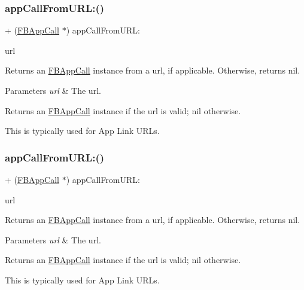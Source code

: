 \subsubsection{\texorpdfstring{app\+Call\+From\+U\+R\+L\+:()}{appCallFromURL:()}\hspace{0.1cm}{\footnotesize\ttfamily [3/5]}}
{\footnotesize\ttfamily + (\hyperlink{interfaceFBAppCall}{F\+B\+App\+Call} $\ast$) app\+Call\+From\+U\+R\+L\+: \begin{DoxyParamCaption}\item[{(N\+S\+U\+RL $\ast$)}]{url }\end{DoxyParamCaption}}

Returns an \hyperlink{interfaceFBAppCall}{F\+B\+App\+Call} instance from a url, if applicable. Otherwise, returns nil.


\begin{DoxyParams}{Parameters}
{\em url} & The url.\\
\hline
\end{DoxyParams}
\begin{DoxyReturn}{Returns}
an \hyperlink{interfaceFBAppCall}{F\+B\+App\+Call} instance if the url is valid; nil otherwise.
\end{DoxyReturn}
This is typically used for App Link U\+R\+Ls. \mbox{\label{interfaceFBAppCall_a03baee771317510fb167dad8926bc176}} 
\subsubsection{\texorpdfstring{app\+Call\+From\+U\+R\+L\+:()}{appCallFromURL:()}\hspace{0.1cm}{\footnotesize\ttfamily [4/5]}}
{\footnotesize\ttfamily + (\hyperlink{interfaceFBAppCall}{F\+B\+App\+Call} $\ast$) app\+Call\+From\+U\+R\+L\+: \begin{DoxyParamCaption}\item[{(N\+S\+U\+RL $\ast$)}]{url }\end{DoxyParamCaption}}

Returns an \hyperlink{interfaceFBAppCall}{F\+B\+App\+Call} instance from a url, if applicable. Otherwise, returns nil.


\begin{DoxyParams}{Parameters}
{\em url} & The url.\\
\hline
\end{DoxyParams}
\begin{DoxyReturn}{Returns}
an \hyperlink{interfaceFBAppCall}{F\+B\+App\+Call} instance if the url is valid; nil otherwise.
\end{DoxyReturn}
This is typically used for App Link U\+R\+Ls. \mbox{\label{interfaceFBAppCall_a03baee771317510fb167dad8926bc176}} 
